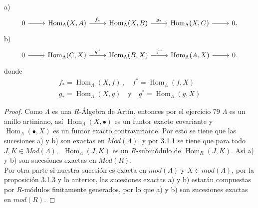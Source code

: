 \documentclass{article}
\begin{document}
\begin{enumerate}[label=\textbf{Ej \arabic*.}]
a)
\[\begin{tikzcd}
0\arrow{r}{} & \operatorname{Hom}_\Lambda(X,A)\arrow{r}{f_*} & \operatorname{Hom}_\Lambda(X,B)\arrow{r}{g_*}&
 \operatorname{Hom}_\Lambda(X,C)\arrow{r}{}& 0.
\end{tikzcd}
\]
b)
\[\begin{tikzcd}
0\arrow{r}{} & \operatorname{Hom}_\Lambda(C,X)\arrow{r}{g^*} & \operatorname{Hom}_\Lambda(B,X)\arrow{r}{f^*}&
 \operatorname{Hom}_\Lambda(A,X)\arrow{r}{}& 0.
\end{tikzcd}
\]
donde 
\begin{align*}
f_*= \operatorname{Hom}_\Lambda(X,f)\,,\quad
f^*= \operatorname{Hom}_\Lambda(f,X)\\
g_*= \operatorname{Hom}_\Lambda(X,g)\quad \text{y}\quad
g^*= \operatorname{Hom}_\Lambda(g,X)
\end{align*}
\begin{proof}
Como $\Lambda$ es una $R$-Álgebra de Artín, entonces por el ejercicio 79 $\Lambda$ es un anillo artiniano, así 
$ \operatorname{Hom}_\Lambda(X,\bullet)$ es un funtor exacto covariante y $ \operatorname{Hom}_\Lambda(\bullet,X)$ es un 
funtor exacto contravariante. Por esto se tiene que las sucesiones a) y b) son exactas en $Mod(\Lambda)$, y por 3.1.1 se tiene que para todo 
$J,K\in Mod(\Lambda),\,\,\, \operatorname{Hom}_\Lambda(J,K)$ es un $R$-submódulo de $ \operatorname{Hom}_R(J,K)$. Así a) y b)
 son sucesiones exactas en $Mod(R)$.\\

Por otra parte si nuestra sucesión es exacta en $mod(\Lambda)$ y $X\in mod(\Lambda)$, por la proposición 3.1.3 y lo anterior, las sucesiones
exactas a) y b) estarán compuestas por $R$-módulos finitamente generados, por lo que a) y b) son sucesiones exactas en $mod(R)$.
\end{proof}
		

\end{enumerate}
\end{document}
